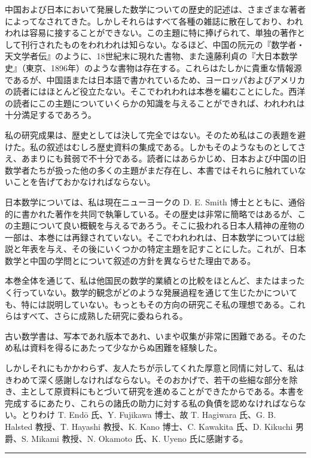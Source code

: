 \documentclass[11pt]{article}
\newcommand{\scanpage}[2]{\clearpage\setcounter{footnote}{0}\noindent{\footnotesize\color{gray}PDF #1 頁 · #2}\par\medskip}
\newcommand{\scanfooter}{}
\begin{document}
中国および日本において発展した数学についての歴史的記述は、さまざまな著者によってなされてきた。しかしそれらはすべて各種の雑誌に散在しており、われわれは容易に接することができない。この主題に特に捧げられて、単独の著作として刊行されたものをわれわれは知らない。なるほど、中国の阮元の『数学者・天文学者伝』のように、18世紀末に現れた書物、また遠藤利貞の『大日本数学史』（東京、1896年）のような書物は存在する。これらはたしかに貴重な情報源であるが、中国語または日本語で書かれているため、ヨーロッパおよびアメリカの読者にはほとんど役立たない。そこでわれわれは本巻を編むことにした。西洋の読者にこの主題についていくらかの知識を与えることができれば、われわれは十分満足するであろう。

私の研究成果は、歴史としては決して完全ではない。そのため私はこの表題を避けた。私の叙述はむしろ歴史資料の集成である。しかもそのようなものとしてさえ、あまりにも貧弱で不十分である。読者にはあらかじめ、日本および中国の旧数学者たちが扱った他の多くの主題がまだ存在し、本書ではそれらに触れていないことを告げておかなければならない。

日本数学については、私は現在ニューヨークの D. E. Smith 博士とともに、通俗的に書かれた著作を共同で執筆している。その歴史は非常に簡略ではあるが、この主題について良い概観を与えるであろう。そこに扱われる日本人精神の産物の一部は、本巻には再録されていない。そこでわれわれは、日本数学については総説と年表を与え、その後にいくつかの特定主題を記すことにした。これが、日本数学と中国の学問とについて叙述の方針を異ならせた理由である。

本巻全体を通じて、私は他国民の数学的業績との比較をほとんど、またはまったく行っていない。数学的観念がどのような発展過程を通じて生じたかについても、特には説明していない。もっともその方向の研究こそ私の理想である。これらはすべて、さらに成熟した研究に委ねられる。

古い数学書は、写本であれ版本であれ、いまや収集が非常に困難である。そのため私は資料を得るにあたって少なからぬ困難を経験した。
\scanfooter

\scanpage{0011}{緒言、第2頁}
しかしそれにもかかわらず、友人たちが示してくれた厚意と同情に対して、私はきわめて深く感謝しなければならない。そのおかげで、若干の些細な部分を除き、主として原資料にもとづいて研究を進めることができたからである。本書を完成するにあたり、これらの諸氏の助力に対する私の負債を認めなければならない。とりわけ T. Endō 氏、Y. Fujikawa 博士、故 T. Hagiwara 氏、G. B. Halsted 教授、T. Hayashi 教授、K. Kano 博士、C. Kawakita 氏、D. Kikuchi 男爵、S. Mikami 教授、N. Okamoto 氏、K. Uyeno 氏に感謝する。

\begin{center}\rule{3cm}{0.4pt}\end{center}
\end{document}
